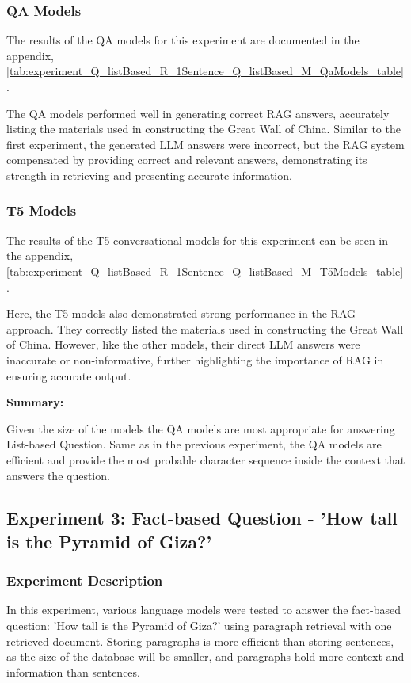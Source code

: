 \documentclass{wseas}
\begin{document}
\subsubsection{QA Models}

The results of the QA models for this experiment are documented in the appendix, \autoref{tab:experiment_Q_listBased_R_1Sentence_Q_listBased_M_QaModels_table}.

The QA models performed well in generating correct RAG answers, accurately listing the materials used in constructing the Great Wall of China. 
Similar to the first experiment, the generated LLM answers were incorrect, but the RAG system compensated by providing correct and relevant answers,
demonstrating its strength in retrieving and presenting accurate information.

\subsubsection{T5 Models}


The results of the T5 conversational models for this experiment can be seen 
in the appendix, \autoref{tab:experiment_Q_listBased_R_1Sentence_Q_listBased_M_T5Models_table}.

Here, the T5 models also demonstrated strong performance in the RAG approach.
They correctly listed the materials used in constructing the Great Wall of China.
However, like the other models, their direct LLM answers were inaccurate or non-informative,
further highlighting the importance of RAG in ensuring accurate output.

\textbf{Summary:}

Given the size of the models the QA models are most appropriate for
answering List-based Question. Same as in the previous experiment, the QA models are efficient and
provide the most probable character sequence inside the context that answers the question.

\subsection{Experiment 3: Fact-based Question - 'How tall is the Pyramid of Giza?'}

\subsubsection{Experiment Description}

In this experiment, various language models were tested to answer the
fact-based question: 'How tall is the Pyramid of Giza?' using paragraph
retrieval with one retrieved document. Storing paragraphs is more 
efficient than storing sentences, as the size of the database will
be smaller, and paragraphs hold more context and information than sentences.
\end{document}
